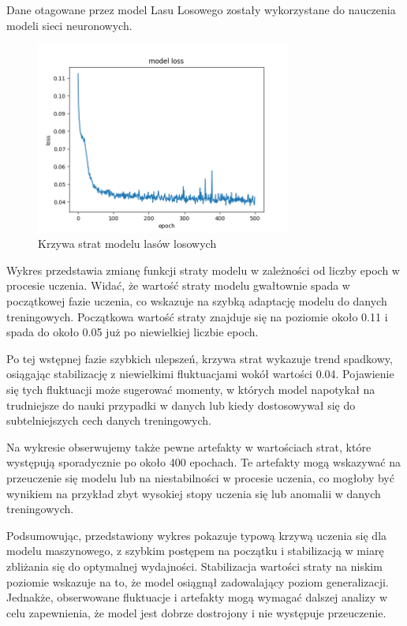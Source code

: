 \documentclass{article}
\begin{document}
Dane otagowane przez model Lasu Losowego zostały wykorzystane do nauczenia modeli sieci neuronowych.

\begin{figure}[H]
    \centering
    \includegraphics[width=0.75\textwidth]{epoch_loss_forest.png}
    \caption{Krzywa strat modelu lasów losowych}
\end{figure}

Wykres przedstawia zmianę funkcji straty modelu w zależności od liczby epoch w procesie uczenia. Widać, że wartość straty modelu gwałtownie spada w początkowej fazie uczenia, co wskazuje na szybką adaptację modelu do danych treningowych. Początkowa wartość straty znajduje się na poziomie około 0.11 i spada do około 0.05 już po niewielkiej liczbie epoch.

Po tej wstępnej fazie szybkich ulepszeń, krzywa strat wykazuje trend spadkowy, osiągając stabilizację z niewielkimi fluktuacjami wokół wartości 0.04. Pojawienie się tych fluktuacji może sugerować momenty, w których model napotykał na trudniejsze do nauki przypadki w danych lub kiedy dostosowywał się do subtelniejszych cech danych treningowych.

Na wykresie obserwujemy także pewne artefakty w wartościach strat, które występują sporadycznie po około 400 epochach. Te artefakty mogą wskazywać na przeuczenie się modelu lub na niestabilności w procesie uczenia, co mogłoby być wynikiem na przykład zbyt wysokiej stopy uczenia się lub anomalii w danych treningowych.

Podsumowując, przedstawiony wykres pokazuje typową krzywą uczenia się dla modelu maszynowego, z szybkim postępem na początku i stabilizacją w miarę zbliżania się do optymalnej wydajności. Stabilizacja wartości straty na niskim poziomie wskazuje na to, że model osiągnął zadowalający poziom generalizacji. Jednakże, obserwowane fluktuacje i artefakty mogą wymagać dalszej analizy w celu zapewnienia, że model jest dobrze dostrojony i nie występuje przeuczenie.
\end{document}

